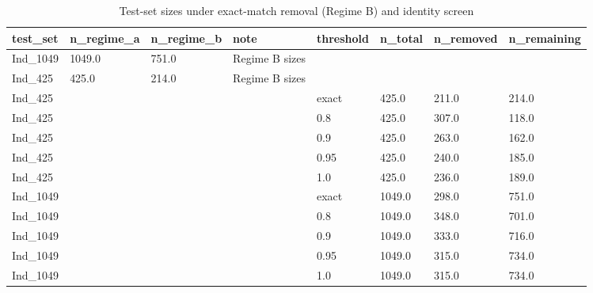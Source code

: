 \begin{table}[ht]
\centering\small
\caption{Test-set sizes under exact-match removal (Regime B) and identity screen}
\label{tab:T3_3_regimes_and_identity_screen}
\begin{tabular}{llllllll}
\hline
test\_set & n\_regime\_a & n\_regime\_b & note & threshold & n\_total & n\_removed & n\_remaining \\
\hline
Ind\_1049 & 1049.0 & 751.0 & Regime B sizes &  &  &  &  \\
Ind\_425 & 425.0 & 214.0 & Regime B sizes &  &  &  &  \\
Ind\_425 &  &  &  & exact & 425.0 & 211.0 & 214.0 \\
Ind\_425 &  &  &  & 0.8 & 425.0 & 307.0 & 118.0 \\
Ind\_425 &  &  &  & 0.9 & 425.0 & 263.0 & 162.0 \\
Ind\_425 &  &  &  & 0.95 & 425.0 & 240.0 & 185.0 \\
Ind\_425 &  &  &  & 1.0 & 425.0 & 236.0 & 189.0 \\
Ind\_1049 &  &  &  & exact & 1049.0 & 298.0 & 751.0 \\
Ind\_1049 &  &  &  & 0.8 & 1049.0 & 348.0 & 701.0 \\
Ind\_1049 &  &  &  & 0.9 & 1049.0 & 333.0 & 716.0 \\
Ind\_1049 &  &  &  & 0.95 & 1049.0 & 315.0 & 734.0 \\
Ind\_1049 &  &  &  & 1.0 & 1049.0 & 315.0 & 734.0 \\
\hline
\end{tabular}
\end{table}
